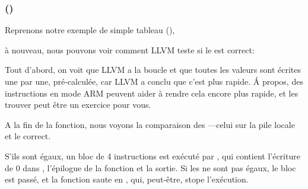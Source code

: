 \subsubsection{\OptimizingXcodeIV (\ThumbTwoMode)}

Reprenons notre exemple de simple tableau (),

à nouveau, nous pouvons voir comment LLVM teste si le  est correct:




Tout d'abord, on voit que LLVM a  la boucle et que toutes les valeurs
sont écrites une par une, pré-calculée, car LLVM a conclu que c'est plus rapide.
Á propos, des instructions en mode ARM peuvent aider à rendre cela encore plus rapide,
et les trouver peut être un exercice pour vous.

A la fin de la fonction, nous voyons la comparaison des ---celui sur la
pile locale et le correct.

S'ils sont égaux, un bloc de 4 instructions est exécuté par , qui
contient l'écriture de 0 dans , l'épilogue de la fonction et la sortie.
Si les  ne sont pas égaux, le bloc est passé, et la fonction saute en
, qui, peut-être, stope l'exécution.
